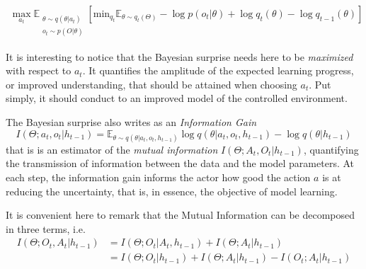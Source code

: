 \documentclass[10pt,letterpaper]{article}
\begin{document}
\begin{align}\label{eq:VFE}
\max_{a_t} \mathbb{E}_{\substack{\theta\sim q(\theta|a_t) \\ o_t\sim p(O|\theta)}} \left[\text{min}_{q_t} \mathbb{E}_{\theta\sim q_t(\Theta)} -\log p(o_t|\theta) + \log q_t(\theta) - \log q_{t-1}(\theta)\right]
\end{align}

It is interesting to notice that the Bayesian surprise %
needs here to be \emph{maximized} with respect to $a_t$. It quantifies the amplitude of the expected learning progress, or improved understanding, that should be attained when choosing $a_t$. Put simply, it should conduct to an improved model of the controlled environment.



  

The Bayesian surprise also writes as an \emph{Information Gain}  $$I(\Theta;a_t,o_t|h_{t-1})=\mathbb{E}_{\theta\sim q(\theta|a_t,o_t,h_{t-1})}\log q(\theta|a_t, o_t, h_{t-1}) - \log q(\theta|h_{t-1}) $$
that is is an estimator of the \emph{mutual information} $I(\Theta;A_t, O_t|h_{t-1})$, quantifying the transmission of information between the data and the model parameters.
At each step, the information gain informs the actor how good the action $a$ is at reducing the uncertainty, that is, in essence, the objective of model learning. %

It is convenient here to remark that the Mutual Information can be decomposed in three terms, i.e. 
\begin{align}\label{eq:MI}
I(\Theta;O_t,A_t|h_{t-1}) &= I(\Theta;O_t|A_t,h_{t-1}) + I(\Theta;A_t|h_{t-1})\\\nonumber
                          &= I(\Theta;O_t|h_{t-1}) + I(\Theta;A_t|h_{t-1}) - I(O_t;A_t|h_{t-1}) 
\end{align}
\end{document}
